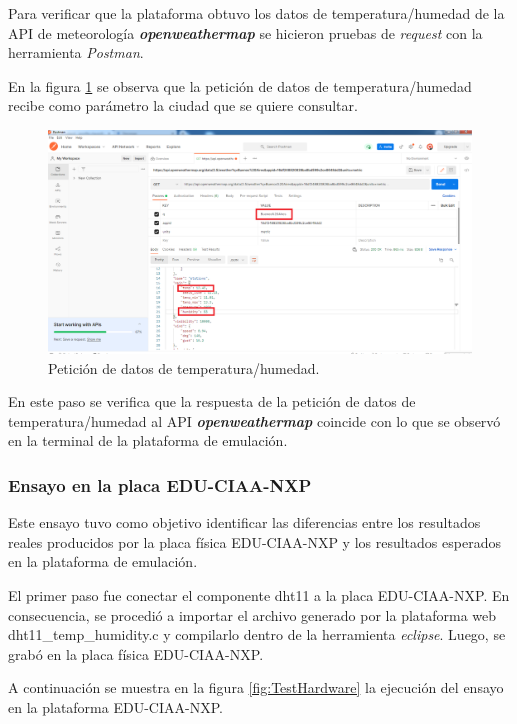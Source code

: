 Para verificar que la plataforma obtuvo los datos de temperatura/humedad de la API de meteorología  \textit{\textbf{openweathermap}} se hicieron pruebas de \textit{request} con la herramienta \textit{Postman}.

En la figura \ref{fig:RespuestaPostMan1} se observa que la petición de datos de temperatura/humedad recibe como parámetro la ciudad que se quiere consultar.



\begin{figure}[ht]
	\centering
	\includegraphics[scale=.30]{./Figures/RespuestaPostMan1.png}
	\caption{Petición de datos de temperatura/humedad.}
	\label{fig:RespuestaPostMan1}
\end{figure}

En este paso se verifica que la respuesta de la petición de datos de temperatura/humedad al API \textit{\textbf{openweathermap}} coincide con lo que se observó en la terminal de la plataforma de emulación.


\subsubsection{Ensayo en la placa EDU-CIAA-NXP} 

Este ensayo tuvo como objetivo identificar
las diferencias entre los resultados reales producidos por la placa física EDU-CIAA-NXP y los resultados esperados en la plataforma de emulación.

El primer paso fue conectar el componente dht11 a la placa EDU-CIAA-NXP. En consecuencia, se procedió a importar el archivo generado por la plataforma web  \textquotedbl dht11\_temp\_humidity.c\textquotedbl{} y compilarlo                     dentro de la herramienta 
\textit{eclipse}. Luego, se grabó en la placa física EDU-CIAA-NXP.

A continuación se muestra en la figura \ref{fig:TestHardware} la ejecución del ensayo en la plataforma EDU-CIAA-NXP.


